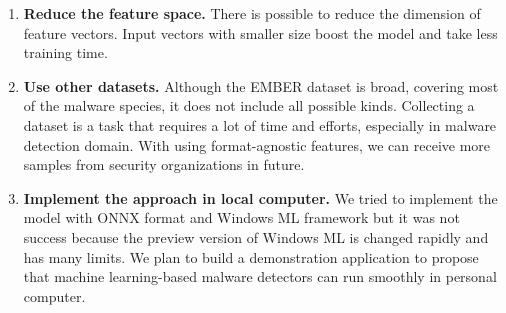 \begin{enumerate}
    \item \textbf{Reduce the feature space. } There is possible to reduce the dimension of feature vectors. Input vectors with smaller size boost the model and take less training time. 
    \item \textbf{Use other datasets. } Although the EMBER dataset is broad, covering most of the malware species, it does not include all possible kinds. Collecting a dataset is a task that requires a lot of time and efforts, especially in malware detection domain. With using format-agnostic features, we can receive more samples from security organizations in future. 
    \item \textbf{Implement the approach in local computer. } We tried to implement the model with ONNX format and Windows ML framework but it was not success because the preview version of Windows ML is changed rapidly and has many limits. We plan to build a demonstration application to propose that machine learning-based malware detectors can run smoothly in personal computer.
\end{enumerate}


